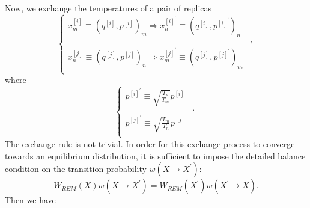 Now, we exchange the temperatures of a pair of replicas
\begin{equation}
	\left\{ 
	\begin{array}{rl} 
		x_m^{[i]}\equiv \left(q^{[i]},p^{[i]}\right)_m \Rightarrow x_n^{[i]^\prime}\equiv \left(q^{[i]},p^{[i]^\prime}\right)_n&\\ 
		&,\\
		x_n^{[j]}\equiv \left(q^{[j]},p^{[j]}\right)_n \Rightarrow x_m^{[j]^\prime}\equiv \left(q^{[j]},p^{[j]^\prime}\right)_m&\\  
	\end{array} 
	\right. 
\end{equation}
where
\begin{equation}
	\left\{ 
	\begin{array}{rl} 
		p^{[i]^\prime}\equiv \sqrt{\frac{T_n}{T_m}} p^{[i]}&\\ 
		&.\\
		p^{[j]^\prime}\equiv \sqrt{\frac{T_m}{T_n}} p^{[j]}&\\  
	\end{array} 
	\right. 
\end{equation}
The exchange rule is not trivial. In order for this exchange process to converge towards an equilibrium distribution, it is sufficient to impose the detailed balance condition on the transition probability $w(X\rightarrow X^\prime)$:
\begin{equation}
	W_{REM}(X)w(X\rightarrow X^\prime) = W_{REM}(X^\prime)w(X^\prime\rightarrow X).
\end{equation}
Then we have
